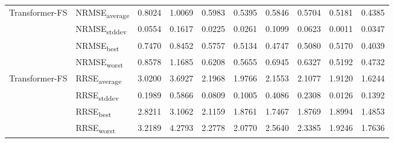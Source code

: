 {\begin{longtable}{l l c c c c c c c c}
\cmidrule(lr){2-10}
\multirow{4}{*}{Transformer-FS} & NRMSE\textsubscript{average} & 0.8024 & 1.0069 & 0.5983 & 0.5395 & 0.5846 & 0.5704 & 0.5181 & 0.4385 \\
 & NRMSE\textsubscript{stddev} & 0.0554 & 0.1617 & 0.0225 & 0.0261 & 0.1099 & 0.0623 & 0.0011 & 0.0347 \\
 & NRMSE\textsubscript{best} & 0.7470 & 0.8452 & 0.5757 & 0.5134 & 0.4747 & 0.5080 & 0.5170 & 0.4039 \\
 & NRMSE\textsubscript{worst} & 0.8578 & 1.1685 & 0.6208 & 0.5655 & 0.6945 & 0.6327 & 0.5192 & 0.4732 \\
\cmidrule(lr){2-10}
\multirow{4}{*}{Transformer-FS} & RRSE\textsubscript{average} & 3.0200 & 3.6927 & 2.1968 & 1.9766 & 2.1553 & 2.1077 & 1.9120 & 1.6244 \\
 & RRSE\textsubscript{stddev} & 0.1989 & 0.5866 & 0.0809 & 0.1005 & 0.4086 & 0.2308 & 0.0126 & 0.1392 \\
 & RRSE\textsubscript{best} & 2.8211 & 3.1062 & 2.1159 & 1.8761 & 1.7467 & 1.8769 & 1.8994 & 1.4853 \\
 & RRSE\textsubscript{worst} & 3.2189 & 4.2793 & 2.2778 & 2.0770 & 2.5640 & 2.3385 & 1.9246 & 1.7636 \\
\cmidrule(lr){2-10}
\end{longtable}
}